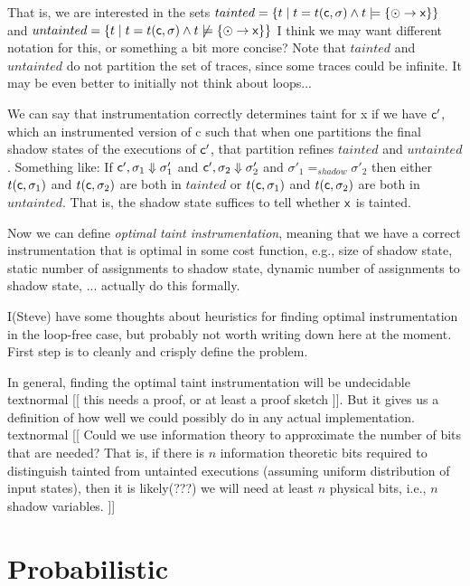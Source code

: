 \documentclass[]{article}
\newcommand{\todo}[1]{textnormal{{\color{black} [[ #1 ]]}}}
\begin{document}
That is, we are interested in the sets $tainted = \{ t \mid t =
t({\sf c},\sigma) \land t \models \{ \odot \rightarrow {\sf x} \} \}$ and
$untainted = \{ t \mid
t = t({\sf c},\sigma) \land t \not\models \{ \odot \rightarrow {\sf x} \} \}$
I think we may want different notation for this, or something a bit more
concise?
Note that $tainted$ and $untainted$ do not partition the set of
traces, since some traces could be infinite. It may be even better to initially not think about loops...

We can say that instrumentation correctly determines taint for {\sf x}
if we have ${\sf c}'$, which an instrumented version of {\sf c} such
that when one partitions the final shadow states of the executions of
${\sf c}'$, that partition refines $tainted$ and
$untainted$. Something like:
If ${\sf c}', \sigma_1 \Downarrow \sigma'_1$ and ${\sf c}', \sigma_2
\Downarrow \sigma'_2$ and $\sigma'_1 =_\mathit{shadow} \sigma'_2$ then
either $t({\sf c},\sigma_1)$ and $t({\sf c},\sigma_2)$ are both in $tainted$ or 
$t({\sf c},\sigma_1)$ and $t({\sf c},\sigma_2)$ are both in $untainted$. That is, the shadow
state suffices to tell whether $\sf x$ is tainted.

Now we can define \emph{optimal taint instrumentation}, meaning that
we have a correct instrumentation that is optimal in some cost
function, e.g., size of shadow state, static number of assignments to
shadow state, dynamic number of assignments to shadow state,
... actually do this formally.

I(Steve) have some thoughts about heuristics for finding optimal
instrumentation in the loop-free case, but probably not worth writing
down here at the moment. First step is to cleanly and crisply define
the problem.

In general, finding the optimal taint instrumentation will be
undecidable \todo{this needs a proof, or at least a proof sketch}. But
it gives us a definition of how well we could possibly do in any
actual implementation. \todo{Could we use information theory to
  approximate the number of bits that are needed? That is, if there is
$n$ information theoretic bits required to distinguish tainted from
untainted executions (assuming uniform distribution of input states), then it is likely(???) we will need at least $n$ physical bits, i.e., $n$
shadow variables.}


\section{Probabilistic}
\end{document}
